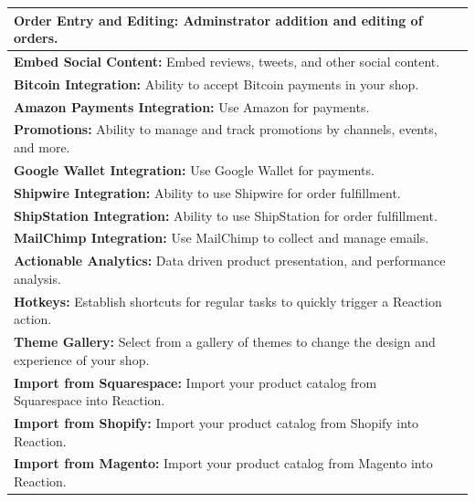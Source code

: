 \begin{table}[h!]
\begin{tabular}{ |L{0.6\paperwidth}|L{0.1\paperwidth}|}
\\ \hline
	\textbf{ Order Entry and Editing:} Adminstrator addition and editing of orders.&
	
\\ \hline
	\textbf{ Embed Social Content:} Embed reviews, tweets, and other social content.&
	
\\ \hline
	\textbf{ Bitcoin Integration:} Ability to accept Bitcoin payments in your shop.&
	
\\ \hline
	\textbf{ Amazon Payments Integration:} Use Amazon for payments.&
	
\\ \hline
	\textbf{ Promotions:} Ability to manage and track promotions by channels, events, and more.&
	
\\ \hline
	\textbf{ Google Wallet Integration:} Use Google Wallet for payments.&
	
\\ \hline
	\textbf{ Shipwire Integration:} Ability to use Shipwire for order fulfillment.&
	
\\ \hline
	\textbf{ ShipStation Integration:} Ability to use ShipStation for order fulfillment.&
	
\\ \hline
	\textbf{ MailChimp Integration:} Use MailChimp to collect and manage emails.&
	
\\ \hline
	\textbf{ Actionable Analytics:} Data driven product presentation, and performance analysis.&
	
\\ \hline
	\textbf{ Hotkeys:} Establish shortcuts for regular tasks to quickly trigger a Reaction action.&
	
\\ \hline
	\textbf{ Theme Gallery:} Select from a gallery of themes to change the design and experience of your shop.&
	
\\ \hline
	\textbf{ Import from Squarespace:} Import your product catalog from Squarespace into Reaction.&
	
\\ \hline
	 \textbf{ Import from Shopify:} Import your product catalog from Shopify into Reaction.&
	
\\ \hline
	\textbf{ Import from Magento:} Import your product catalog from Magento into Reaction.&
	

\end{tabular}
\end{table}
